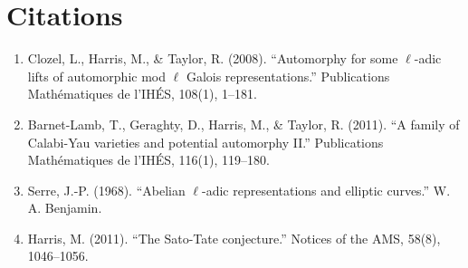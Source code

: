 \section{Citations}

\begin{enumerate}
\item Clozel, L., Harris, M., \& Taylor, R. (2008). ``Automorphy for some $\ell$-adic lifts of automorphic mod $\ell$ Galois representations.'' Publications Mathématiques de l'IHÉS, 108(1), 1--181.
\item Barnet-Lamb, T., Geraghty, D., Harris, M., \& Taylor, R. (2011). ``A family of Calabi-Yau varieties and potential automorphy II.'' Publications Mathématiques de l'IHÉS, 116(1), 119--180.
\item Serre, J.-P. (1968). ``Abelian $\ell$-adic representations and elliptic curves.'' W. A. Benjamin.
\item Harris, M. (2011). ``The Sato-Tate conjecture.'' Notices of the AMS, 58(8), 1046--1056.
\end{enumerate}
